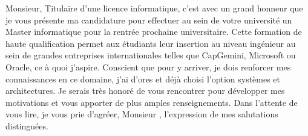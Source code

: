 \documentclass[11pt, a4paper]{awesome-cv}
\begin{document}
\makecvheader

\makelettertitle

\begin{cvletter}

Monsieur, Titulaire d'une licence informatique, c'est avec un grand honneur que je vous présente ma candidature pour effectuer au sein de votre université un Master informatique pour la rentrée prochaine universitaire. Cette formation de haute qualification permet aux étudiants leur insertion au niveau ingénieur au sein de grandes entreprises internationales telles que CapGemini, Microsoft ou Oracle, ce à quoi j'aspire. Conscient que pour y arriver, je dois renforcer mes connaissances en ce domaine, j'ai d'ores et déjà choisi l'option systèmes et architectures. Je serais très honoré de vous rencontrer pour développer mes motivations et vous apporter de plus amples renseignements. Dans l'attente de vous lire, je vous prie d'agréer, Monsieur , l'expression de mes salutations distinguées.

\end{cvletter}

\makeletterclosing
\end{document}
